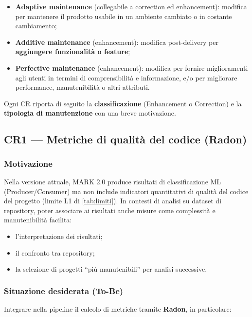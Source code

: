 \documentclass[11pt,a4paper]{article}
\newcommand{\baselineName}{MARK 2.0}
\begin{document}
\begin{itemize}
  \item \textbf{Adaptive maintenance} (collegabile a correction ed
    enhancement): modifica per mantenere il prodotto usabile in un ambiente
    cambiato o in costante cambiamento;
  \item \textbf{Additive maintenance} (enhancement): modifica post-delivery per
    \textbf{aggiungere funzionalit\`a o feature};
  \item \textbf{Perfective maintenance} (enhancement): modifica per fornire
    miglioramenti agli utenti in termini di comprensibilit\`a e informazione,
    e/o per migliorare performance, manutenibilit\`a o altri attributi.
\end{itemize}

Ogni CR riporta di seguito la \textbf{classificazione} (Enhancement o
Correction) e la \textbf{tipologia di manutenzione} con una breve motivazione.

\subsection{CR1 --- Metriche di qualit\`a del codice (Radon)}
\label{sec:cr1}

\subsubsection*{Motivazione}

Nella versione attuale, \baselineName{} produce risultati di classificazione ML
(Producer/Consumer) ma non include indicatori quantitativi di qualit\`a del
codice del progetto (limite L1 di \cref{tab:limiti}). In contesti di analisi su
dataset di repository, poter associare ai risultati anche misure come
complessit\`a e manutenibilit\`a facilita:

\begin{itemize}[nosep]
  \item l'interpretazione dei risultati;
  \item il confronto tra repository;
  \item la selezione di progetti ``pi\`u manutenibili'' per analisi successive.
\end{itemize}

\subsubsection*{Situazione desiderata (To-Be)}

Integrare nella pipeline il calcolo di metriche tramite \textbf{Radon}, in
particolare:
\end{document}
